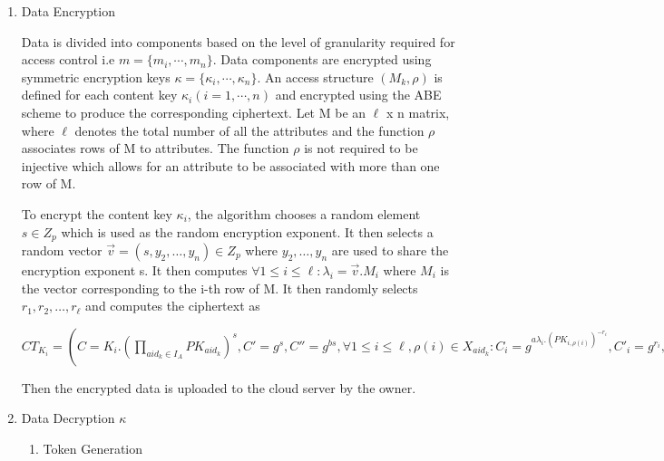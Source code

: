 \begin{enumerate}
	\item Data Encryption
	
	Data is divided into components based on the level of granularity required for access control i.e $ m = \{m_{i}, \cdots, m_{n}\} $. Data components are encrypted using symmetric encryption keys $ \kappa = \{\kappa_{i}, \cdots, \kappa_{n}\} $. An access structure $ (M_{k}, \rho) $ is defined for each content key $ \kappa_{i} (i = 1, \cdots, n) $ and encrypted using the ABE scheme to produce the corresponding ciphertext. Let M be an $\ell$ x n matrix, where $\ell$ denotes the total number of all the attributes and the function $ \rho $ associates rows of M to attributes. The function $\rho$ is not required to be injective which allows for an attribute to be associated with more than one row of M.
	
	To encrypt the content key $\kappa_{i}$, the algorithm chooses a random element $ s \in Z_{p} $ which is used as the random encryption exponent. It then selects a random vector $ \vec{v} = (s, y_{2},\ldots,y_{n}) \in Z_{p} $ where $ y_{2},\ldots,y_{n} $ are used to share the encryption exponent s. It then computes $ \forall 1 \leq i \leq \ell: \lambda_{i} = \vec{v}.M_{i} $ where $ M_{i} $ is the vector corresponding to the i-th row of M. It then randomly selects $ r_{1},r_{2},\ldots,r_{\ell} $ and computes the ciphertext as
	
	$ CT_{K_{i}} = (C = K_{i}.(\prod\limits_{aid_{k} \in I_{A}}PK_{aid_{k}})^{s}, C' = g^{s}, C'' = g^{bs},	\forall 1 \leq i \leq \ell, \rho(i) \in X_{aid_{k}} \colon C_{i} = g^{a\lambda_{i}.(PK_{i,\rho(i)})^{-r_{i}}}, C'_{i} = g^{r_{i}},	D_{i} = g^{\frac{r_{i}}{\beta_{aid_k}}}, D'_{i} = (PK_{2,\rho_{(i)}})^{r_{i}}) $
	
	Then the encrypted data is uploaded to the cloud server by the owner.
	
	\item Data Decryption
	$\kappa$
	\begin{enumerate}
		
		\item Token Generation
	
	\end{enumerate}
	
	
	
\end{enumerate}
